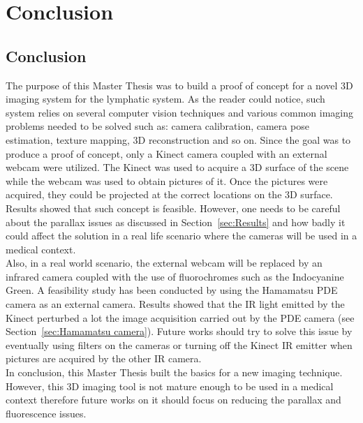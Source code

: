 \chapter[Conclusion]{Conclusion}
\section{Conclusion}

The purpose of this Master Thesis was to build a proof of concept for a novel 3D imaging system for the lymphatic system. As the reader could notice, such system relies on several computer vision techniques and various common imaging problems needed to be solved such as: camera calibration, camera pose estimation, texture mapping, 3D reconstruction and so on. Since the goal was to produce a proof of concept, only a Kinect camera coupled with an external webcam were utilized. The Kinect was used to acquire a 3D surface of the scene while the webcam was used to obtain pictures of it. Once the pictures were acquired, they could be projected at the correct locations on the 3D surface. Results showed that such concept is feasible. However, one needs to be careful about the parallax issues as discussed in Section~\ref{sec:Results} and how badly it could affect the solution in a real life scenario where the cameras will be used in a medical context.\\ 

Also, in a real world scenario, the external webcam will be replaced by an infrared camera coupled with the use of fluorochromes such as the Indocyanine Green. A feasibility study has been conducted by using the Hamamatsu PDE camera as an external camera. Results showed that the IR light emitted by the Kinect perturbed a lot the image acquisition carried out by the PDE camera (see Section~\ref{sec:Hamamatsu camera}). Future works should try to solve this issue by eventually using filters on the cameras or turning off the Kinect IR emitter when pictures are acquired by the other IR camera.\\

In conclusion, this Master Thesis built the basics for a new imaging technique. However, this 3D imaging tool is not mature enough to be used in a medical context therefore future works on it should focus on reducing the parallax and fluorescence issues.  